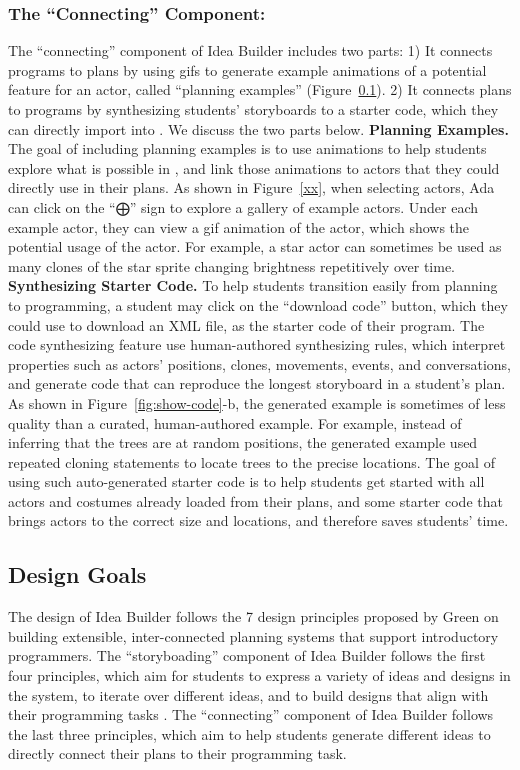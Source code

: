 \subsubsection{The ``Connecting'' Component: } 
The ``connecting'' component of Idea Builder includes two parts: 1) It connects programs to plans by using gifs to generate example animations of a potential feature for an actor, called ``planning examples'' (Figure~\ref{}). 2) It connects plans to programs by synthesizing students' storyboards to a starter code, which they can directly import into \snap. We discuss the two parts below. 
\textbf{Planning Examples. } The goal of including planning examples is to use animations to help students explore what is possible in \snap, and link those animations to actors that they could directly use in their plans.  As shown in Figure~\ref{xx}, when selecting actors, Ada can click on the ``⨁'' sign to explore a gallery of example actors. Under each example actor, they can view a gif animation of the actor, which shows the potential usage of the actor. For example, a star actor can sometimes be used as many clones of the star sprite changing brightness repetitively over time. 
\textbf{Synthesizing Starter Code. }  To help students transition easily from planning to programming, a student may click on the ``download code'' button, which they could use to download an XML file, as the starter code of their \snap program.  The code synthesizing feature use human-authored synthesizing rules, which interpret properties such as actors' positions, clones, movements, events, and conversations, and generate code that can reproduce the longest storyboard in a student's plan. As shown in Figure~\ref{fig:show-code}-b, the generated example is sometimes of less quality than a curated, human-authored example. For example, instead of inferring that the trees are at random positions, the generated example used repeated cloning statements to locate trees to the precise locations. The goal of using such auto-generated starter code is to help students get started with all actors and costumes already loaded from their plans, and some starter code that brings actors to the correct size and locations, and therefore saves students' time. 
 


\subsection{Design Goals}

The design of Idea Builder follows the 7 design principles proposed by Green \cite{alphonce2005green} on building extensible, inter-connected planning systems that support introductory programmers. The ``storyboading'' component of Idea Builder follows the first four principles, which aim for students to express a variety of ideas and designs in the system, to iterate over different ideas, and to build designs that align with their programming tasks \cite{alphonce2005green}. The ``connecting'' component of Idea Builder follows the last three principles, which aim to help students generate different ideas to directly connect their plans to their programming task. 


